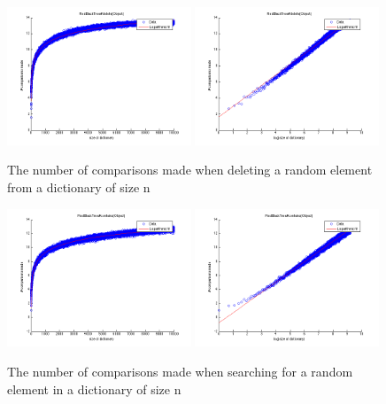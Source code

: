 \begin{figure}[!htbp]
    \centering
    \includegraphics[width=0.49\textwidth]{resources/del}
    \includegraphics[width=0.49\textwidth]{resources/del_log}
    \caption{The number of comparisons made when deleting a random element from a dictionary of size n}
\end{figure}

\begin{figure}[!htbp]
    \centering
    \includegraphics[width=0.49\textwidth]{resources/search}
    \includegraphics[width=0.49\textwidth]{resources/search_log}
    \caption{The number of comparisons made when searching for a random element in a dictionary of size n}
\end{figure}

